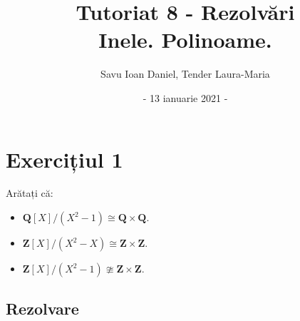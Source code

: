 \documentclass{article}
\title{Tutoriat 8 - Rezolvări \\
\Large  Inele. Polinoame. }
\date{- 13 ianuarie 2021 -}
\author{Savu Ioan Daniel, Tender Laura-Maria}
\begin{document}
\maketitle
\section{Exercițiul 1}
Arătați că:
\begin{itemize}
    \item $\mathbf{Q}[X]/(X^2-1) \cong \mathbf{Q} \times \mathbf{Q}.$
    \item $\mathbf{Z}[X]/(X^2-X) \cong \mathbf{Z} \times \mathbf{Z}.$
    \item $\mathbf{Z}[X]/(X^2-1) \ncong \mathbf{Z} \times \mathbf{Z}.$
\end{itemize}
\subsection{Rezolvare}
\end{document}

